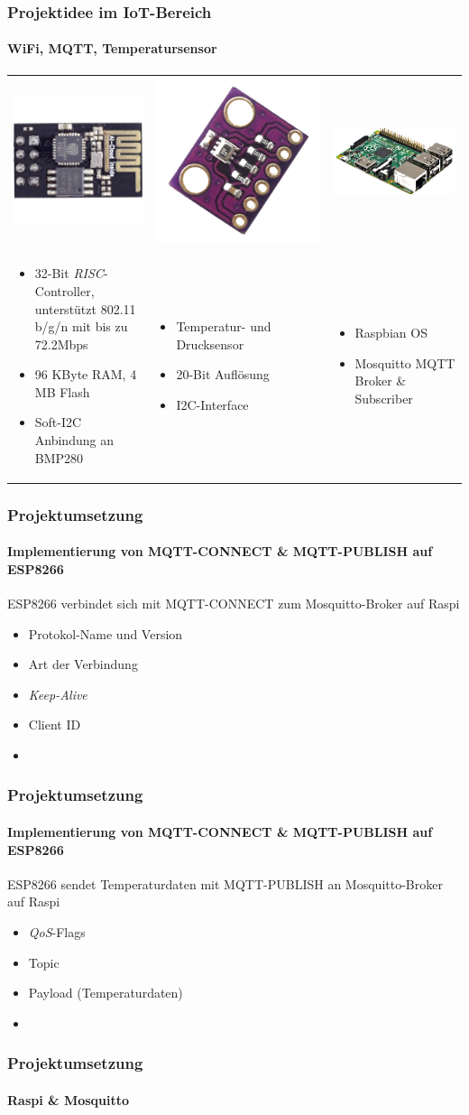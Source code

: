 \documentclass{beamer}
\begin{document}
\begin{frame}

\frametitle{Projektidee im IoT-Bereich}
\framesubtitle{WiFi, MQTT, Temperatursensor}
\begin{tabularx}{\textwidth}{XXX}
	\includegraphics[scale=0.1]{images/esp8266.jpg} & \includegraphics[scale=0.05]{images/bmp280.png} & \includegraphics[scale=0.15]{images/raspi.png} \\
	\begin{itemize}
		\item 32-Bit \textit{RISC}- Controller, unterstützt 802.11 b/g/n mit bis zu 72.2Mbps
		\item 96 KByte RAM, 4 MB Flash
		\item Soft-I2C Anbindung an BMP280
	\end{itemize} & \begin{itemize}
		\item Temperatur- und Drucksensor
		\item 20-Bit Auflösung
		\item I2C-Interface
	\end{itemize} & \begin{itemize}
		\item Raspbian OS
		\item Mosquitto MQTT Broker \& Subscriber
	\end{itemize}
\end{tabularx}

\end{frame}

\begin{frame}

\frametitle{Projektumsetzung}
\framesubtitle{Implementierung von MQTT-CONNECT \& MQTT-PUBLISH auf ESP8266}
ESP8266 verbindet sich mit MQTT-CONNECT zum Mosquitto-Broker auf Raspi
\begin{itemize}
	\item Protokol-Name und Version
	\item Art der Verbindung
	\item \textit{Keep-Alive}
	\item Client ID
	\item {}
	
\end{itemize}

\end{frame}

\begin{frame}

\frametitle{Projektumsetzung}
\framesubtitle{Implementierung von MQTT-CONNECT \& MQTT-PUBLISH auf ESP8266}
ESP8266 sendet Temperaturdaten mit MQTT-PUBLISH an Mosquitto-Broker auf Raspi
\begin{itemize}
	\item \textit{QoS}-Flags
	\item Topic
	\item Payload (Temperaturdaten)
	\item {}
	
\end{itemize}

\end{frame}

\begin{frame}

\frametitle{Projektumsetzung}
\framesubtitle{Raspi \& Mosquitto}

\end{frame}


\begin{frame}

\frametitle{Projektumsetzu
\end{frame}
\end{document}
